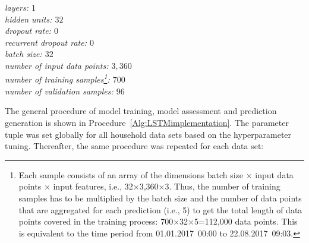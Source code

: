 \begin{multicols}{2}
    \indent\textit{layers: $1$\\
    \indent hidden units: $32$\\
    \indent dropout rate: $0$\\
    \indent recurrent dropout rate: $0$\\
    \indent batch size: $32$\\
    \indent number of input data points: $3,360$\\
    \indent number of training samples\footnote{Each sample consists of an array of the dimensions batch size $\times$ input data points $\times$ input features, i.e., 32$\times$3,360$\times$3. Thus, the number of training samples has to be multiplied by the batch size and the number of data points that are aggregated for each prediction (i.e., 5) to get the total length of data points covered in the training process: 700$\times$32$\times$5=112,000 data points. This is equivalent to the time period from 01.01.2017~00:00 to 22.08.2017~09:03.}: $700$ \\
    \indent number of validation samples: $96$}
\end{multicols}

The general procedure of model training, model assessment and prediction generation is shown in Procedure~\ref{Alg:LSTMimplementation}. The parameter tuple was set globally for all household data sets based on the hyperparameter tuning. Thereafter, the same procedure was repeated for each data set:

